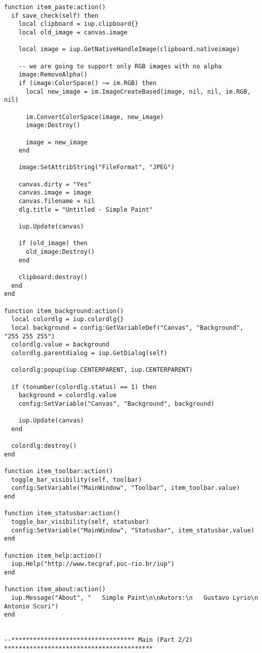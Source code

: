 \documentclass{ctexart}
\begin{document}
\begin{lstlisting}
function item_paste:action()
  if save_check(self) then
    local clipboard = iup.clipboard{}
    local old_image = canvas.image

    local image = iup.GetNativeHandleImage(clipboard.nativeimage)

    -- we are going to support only RGB images with no alpha
    image:RemoveAlpha()
    if (image:ColorSpace() ~= im.RGB) then
      local new_image = im.ImageCreateBased(image, nil, nil, im.RGB, nil)        

      im.ConvertColorSpace(image, new_image)
      image:Destroy()

      image = new_image
    end

    image:SetAttribString("FileFormat", "JPEG")

    canvas.dirty = "Yes"
    canvas.image = image
    canvas.filename = nil
    dlg.title = "Untitled - Simple Paint"

    iup.Update(canvas)

    if (old_image) then
      old_image:Destroy()
    end

    clipboard:destroy()
  end
end

function item_background:action()
  local colordlg = iup.colordlg{}
  local background = config:GetVariableDef("Canvas", "Background", "255 255 255")
  colordlg.value = background
  colordlg.parentdialog = iup.GetDialog(self)

  colordlg:popup(iup.CENTERPARENT, iup.CENTERPARENT)

  if (tonumber(colordlg.status) == 1) then
    background = colordlg.value
    config:SetVariable("Canvas", "Background", background)

    iup.Update(canvas)
  end

  colordlg:destroy()
end

function item_toolbar:action()
  toggle_bar_visibility(self, toolbar)
  config:SetVariable("MainWindow", "Toolbar", item_toolbar.value)
end

function item_statusbar:action()
  toggle_bar_visibility(self, statusbar)
  config:SetVariable("MainWindow", "Statusbar", item_statusbar.value)
end

function item_help:action()
  iup.Help("http://www.tecgraf.puc-rio.br/iup")
end

function item_about:action()
  iup.Message("About", "   Simple Paint\n\nAutors:\n   Gustavo Lyrio\n   Antonio Scuri")
end


--********************************** Main (Part 2/2) *****************************************



\end{lstlisting}
\end{document}
